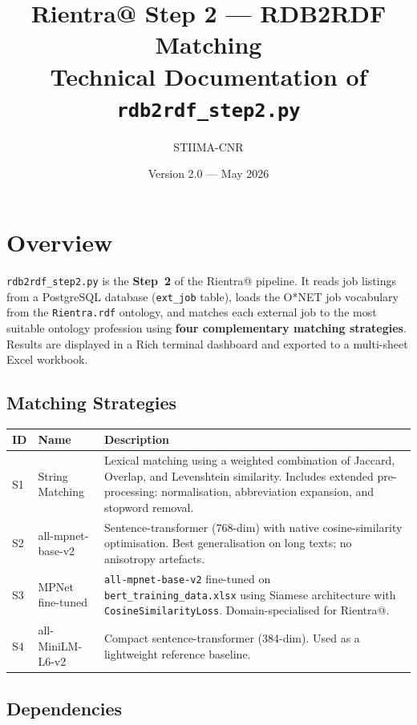 ﻿\documentclass[12pt,a4paper]{article}
\title{\textbf{Rientra@ Step 2 --- RDB2RDF Matching}\\[0.5em]
       \large Technical Documentation of \texttt{rdb2rdf\_step2.py}}
\author{STIIMA-CNR}
\date{Version 2.0 --- May 2026}
\begin{document}
\begin{titlepage}
\centering
\maketitle
\end{titlepage}

\tableofcontents
\newpage

\clearpage
\section{Overview}

\texttt{rdb2rdf\_step2.py} is the \textbf{Step~2} of the Rientra@ pipeline. It reads job listings from a PostgreSQL database (\texttt{ext\_job} table), loads the O*NET job vocabulary from the \texttt{Rientra.rdf} ontology, and matches each external job to the most suitable ontology profession using \textbf{four complementary matching strategies}. Results are displayed in a Rich terminal dashboard and exported to a multi-sheet Excel workbook.

\subsection{Matching Strategies}

\begin{longtable}{@{}P{1.5cm}P{3.5cm}P{9.5cm}@{}}
\toprule
\textbf{ID} & \textbf{Name} & \textbf{Description} \\
\midrule
\endhead
S1 & String Matching &
  Lexical matching using a weighted combination of Jaccard, Overlap, and Levenshtein similarity.
  Includes extended pre-processing: normalisation, abbreviation expansion, and stopword removal. \\
S2 & all-mpnet-base-v2 &
  Sentence-transformer (768-dim) with native cosine-similarity optimisation.
  Best generalisation on long texts; no anisotropy artefacts. \\
S3 & MPNet fine-tuned &
  \texttt{all-mpnet-base-v2} fine-tuned on \texttt{bert\_training\_data.xlsx} using Siamese architecture
  with \texttt{CosineSimilarityLoss}. Domain-specialised for Rientra@. \\
S4 & all-MiniLM-L6-v2 &
  Compact sentence-transformer (384-dim). Used as a lightweight reference baseline. \\
\bottomrule
\end{longtable}

\subsection{Dependencies}
\end{document}

